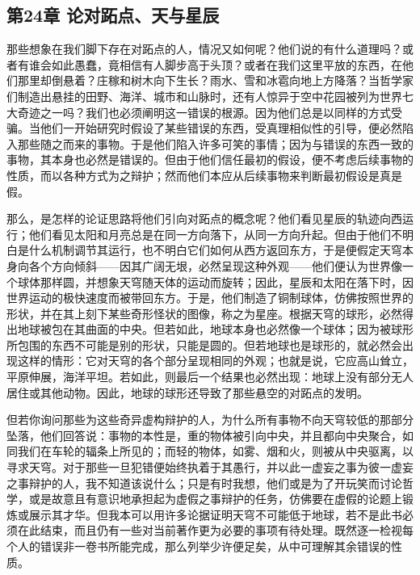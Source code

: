 \subsection{第24章 论对跖点、天与星辰}

那些想象在我们脚下存在对跖点的人，情况又如何呢？他们说的有什么道理吗？或者有谁会如此愚蠢，竟相信有人脚步高于头顶？或者在我们这里平放的东西，在他们那里却倒悬着？庄稼和树木向下生长？雨水、雪和冰雹向地上方降落？当哲学家们制造出悬挂的田野、海洋、城市和山脉时，还有人惊异于空中花园被列为世界七大奇迹之一吗？我们也必须阐明这一错误的根源。因为他们总是以同样的方式受骗。当他们一开始研究时假设了某些错误的东西，受真理相似性的引导，便必然陷入那些随之而来的事物。于是他们陷入许多可笑的事情；因为与错误的东西一致的事物，其本身也必然是错误的。但由于他们信任最初的假设，便不考虑后续事物的性质，而以各种方式为之辩护；然而他们本应从后续事物来判断最初假设是真是假。\par

那么，是怎样的论证思路将他们引向对跖点的概念呢？他们看见星辰的轨迹向西运行；他们看见太阳和月亮总是在同一方向落下，从同一方向升起。但由于他们不明白是什么机制调节其运行，也不明白它们如何从西方返回东方，于是便假定天穹本身向各个方向倾斜——因其广阔无垠，必然呈现这种外观——他们便认为世界像一个球体那样圆，并想象天穹随天体的运动而旋转；因此，星辰和太阳在落下时，因世界运动的极快速度而被带回东方。于是，他们制造了铜制球体，仿佛按照世界的形状，并在其上刻下某些奇形怪状的图像，称之为星座。根据天穹的球形，必然得出地球被包在其曲面的中央。但若如此，地球本身也必然像一个球体；因为被球形所包围的东西不可能是别的形状，只能是圆的。但若地球也是球形的，就必然会出现这样的情形：它对天穹的各个部分呈现相同的外观；也就是说，它应高山耸立，平原伸展，海洋平坦。若如此，则最后一个结果也必然出现：地球上没有部分无人居住或其他动物。因此，地球的球形还导致了那些悬空的对跖点的发明。\par

但若你询问那些为这些奇异虚构辩护的人，为什么所有事物不向天穹较低的那部分坠落，他们回答说：事物的本性是，重的物体被引向中央，并且都向中央聚合，如同我们在车轮的辐条上所见的；而轻的物体，如雾、烟和火，则被从中央驱离，以寻求天穹。对于那些一旦犯错便始终执着于其愚行，并以此一虚妄之事为彼一虚妄之事辩护的人，我不知道该说什么；只是有时我想，他们或是为了开玩笑而讨论哲学，或是故意且有意识地承担起为虚假之事辩护的任务，仿佛要在虚假的论题上锻炼或展示其才华。但我本可以用许多论据证明天穹不可能低于地球，若不是此书必须在此结束，而且仍有一些对当前著作更为必要的事项有待处理。既然逐一检视每个人的错误非一卷书所能完成，那么列举少许便足矣，从中可理解其余错误的性质。\par


